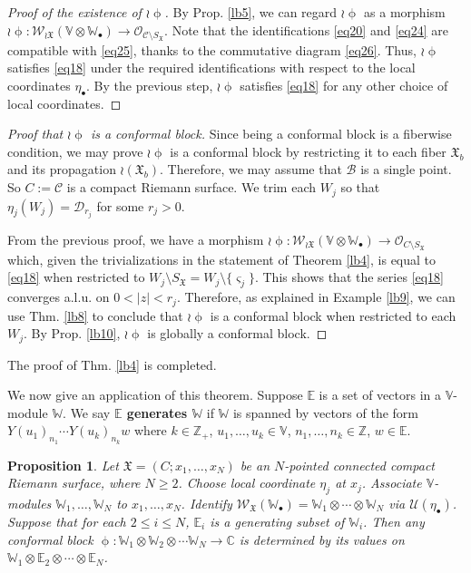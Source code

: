 \documentclass[12pt,a4paper,notitlepage]{article}
\theoremstyle{definition}
\theoremstyle{plain}
\newtheorem{pp}[df]{Proposition}
\newcommand{\fk}{\mathfrak}
\newcommand{\mc}{\mathcal}
\newcommand{\scr}{\mathscr}
\newcommand{\sgm}{\varsigma}
\newcommand{\SX}{{S_{\fk X}}}
\newcommand{\blt}{\bullet}
\newcommand{\Vbb}{\mathbb V}
\newcommand{\Wbb}{\mathbb W}
\newcommand{\Cbb}{\mathbb C}
\newcommand{\Zbb}{\mathbb Z}
\newcommand{\Ebb}{\mathbb E}
\numberwithin{equation}{section}
\begin{document}
\begin{proof}[Proof  of the existence of $\wr\upphi$]
By Prop. \ref{lb5}, we can regard $\wr\upphi$ as a morphism $\wr\upphi:\scr W_{\wr\fk X}(\Vbb\otimes\Wbb_\blt)\rightarrow\scr O_{\mc C\setminus\SX}$. Note that the identifications \eqref{eq20} and \eqref{eq24} are compatible with \eqref{eq25}, thanks to the commutative diagram \eqref{eq26}. Thus, $\wr\upphi$  satisfies \eqref{eq18} under the required identifications with respect to the local coordinates $\eta_\blt$. By the previous step, $\wr\upphi$  satisfies \eqref{eq18} for any other choice of local coordinates.
\end{proof}


\begin{proof}[Proof that $\wr\upphi$ is a conformal block]
Since being a conformal block is a fiberwise condition, we may prove $\wr\upphi$ is a conformal block by restricting it to each fiber $\fk X_b$ and its propagation $\wr(\fk X_b)$. Therefore, we may assume that $\mc B$ is a single point. So $C:=\mc C$ is a compact Riemann surface. We trim each $W_j$ so that $\eta_j(W_j)=\mc D_{r_j}$ for some $r_j>0$.

From the previous proof, we have a morphism $\wr\upphi:\scr W_{\wr\fk X}(\Vbb\otimes\Wbb_\blt)\rightarrow\scr O_{C\setminus\SX}$ which, given the trivializations in the statement of Theorem \ref{lb4}, is equal to \eqref{eq18} when restricted to $W_j\setminus\SX=W_j\setminus\{\sgm_j\}$. This shows that the series \eqref{eq18} converges a.l.u. on $0<|z|<r_j$. Therefore, as explained in Example \ref{lb9}, we can use Thm. \ref{lb8} to conclude that $\wr\upphi$ is a conformal block when restricted to each $W_j$. By Prop. \ref{lb10}, $\wr\upphi$ is globally a conformal block.
\end{proof}


The proof of Thm. \ref{lb4} is completed.

We now give an application of this theorem. Suppose $\Ebb$ is a set of vectors in a $\Vbb$-module $\Wbb$. We say \textbf{$\Ebb$ generates $\Wbb$} if $\Wbb$ is spanned by vectors of the form $Y(u_1)_{n_1}\cdots Y(u_k)_{n_k}w$ where $k\in\Zbb_+$, $u_1,\dots,u_k\in\Vbb$, $n_1,\dots,n_k\in\Zbb$, $w\in\Ebb$. 


\begin{pp}\label{lb12}
Let $\fk X=(C;x_1,\dots,x_N)$ be an $N$-pointed connected compact Riemann surface, where $N\geq 2$. Choose local coordinate $\eta_j$ at $x_j$. Associate $\Vbb$-modules $\Wbb_1,\dots,\Wbb_N$ to $x_1,\dots,x_N$. Identify $\scr W_{\fk X}(\Wbb_\blt)=\Wbb_1\otimes\cdots\otimes\Wbb_N$ via $\mc U(\eta_\blt)$. Suppose that for each $2\leq i\leq N$, $\Ebb_i$ is a generating subset of $\Wbb_i$. Then any conformal block $\upphi:\Wbb_1\otimes\Wbb_2\otimes\cdots\Wbb_N\rightarrow\Cbb$ is determined by its values on $\Wbb_1\otimes\Ebb_2\otimes\cdots\otimes\Ebb_N$.
\end{pp}
\end{document}
